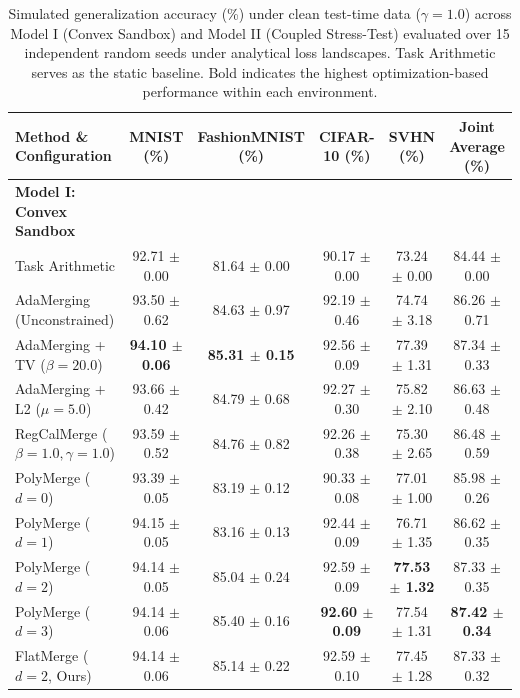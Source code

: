 \begin{table}[t]
\caption{Simulated generalization accuracy (\%) under clean test-time data ($\gamma=1.0$) across Model I (Convex Sandbox) and Model II (Coupled Stress-Test) evaluated over 15 independent random seeds under analytical loss landscapes. Task Arithmetic serves as the static baseline. Bold indicates the highest optimization-based performance within each environment.}
\label{tab:clean_results}
\vskip 0.15in
\begin{center}
\begin{small}
\begin{sc}
\begin{tabular}{lccccc}
\toprule
Method \& Configuration & MNIST (\%) & FashionMNIST (\%) & CIFAR-10 (\%) & SVHN (\%) & Joint Average (\%) \\
\midrule
\textbf{Model I: Convex Sandbox} & & & & & \\
Task Arithmetic & 92.71 $\pm$ 0.00 & 81.64 $\pm$ 0.00 & 90.17 $\pm$ 0.00 & 73.24 $\pm$ 0.00 & 84.44 $\pm$ 0.00 \\
AdaMerging (Unconstrained) & 93.50 $\pm$ 0.62 & 84.63 $\pm$ 0.97 & 92.19 $\pm$ 0.46 & 74.74 $\pm$ 3.18 & 86.26 $\pm$ 0.71 \\
AdaMerging + TV ($\beta=20.0$) & \textbf{94.10 $\pm$ 0.06} & \textbf{85.31 $\pm$ 0.15} & 92.56 $\pm$ 0.09 & 77.39 $\pm$ 1.31 & 87.34 $\pm$ 0.33 \\
AdaMerging + L2 ($\mu=5.0$) & 93.66 $\pm$ 0.42 & 84.79 $\pm$ 0.68 & 92.27 $\pm$ 0.30 & 75.82 $\pm$ 2.10 & 86.63 $\pm$ 0.48 \\
RegCalMerge ($\beta=1.0, \gamma=1.0$) & 93.59 $\pm$ 0.52 & 84.76 $\pm$ 0.82 & 92.26 $\pm$ 0.38 & 75.30 $\pm$ 2.65 & 86.48 $\pm$ 0.59 \\
PolyMerge ($d=0$) & 93.39 $\pm$ 0.05 & 83.19 $\pm$ 0.12 & 90.33 $\pm$ 0.08 & 77.01 $\pm$ 1.00 & 85.98 $\pm$ 0.26 \\
PolyMerge ($d=1$) & 94.15 $\pm$ 0.05 & 83.16 $\pm$ 0.13 & 92.44 $\pm$ 0.09 & 76.71 $\pm$ 1.35 & 86.62 $\pm$ 0.35 \\
PolyMerge ($d=2$) & 94.14 $\pm$ 0.05 & 85.04 $\pm$ 0.24 & 92.59 $\pm$ 0.09 & \textbf{77.53 $\pm$ 1.32} & 87.33 $\pm$ 0.35 \\
PolyMerge ($d=3$) & 94.14 $\pm$ 0.06 & 85.40 $\pm$ 0.16 & \textbf{92.60 $\pm$ 0.09} & 77.54 $\pm$ 1.31 & \textbf{87.42 $\pm$ 0.34} \\
FlatMerge ($d=2$, Ours) & 94.14 $\pm$ 0.06 & 85.14 $\pm$ 0.22 & 92.59 $\pm$ 0.10 & 77.45 $\pm$ 1.28 & 87.33 $\pm$ 0.32 \\

\end{tabular}
\end{sc}
\end{small}
\end{center}
\end{table}
